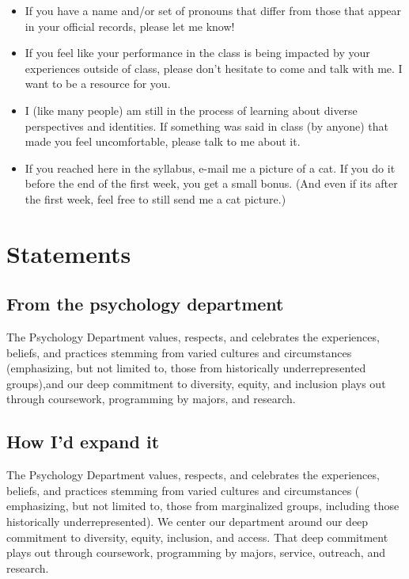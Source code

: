 \begin{itemize}
\item
  If you have a name and/or set of pronouns that differ from those that appear in your official records, please let me know!
\item
  If you feel like your performance in the class is being impacted by your experiences outside of class, please don't hesitate to come and talk with me. I want to be a resource for you.
\item
  I (like many people) am still in the process of learning about diverse perspectives and identities. If something was said in class (by anyone) that made you feel uncomfortable, please talk to me about it.
\item
  If you reached here in the syllabus, e-mail me a picture of a cat. If you do it before the end of the first week, you get a small bonus. (And even if its after the first week, feel free to still send me a cat picture.)
\end{itemize}

\hypertarget{statements}{%
\section{Statements}\label{statements}}

\hypertarget{from-the-psychology-department}{%
\subsection{From the psychology department}\label{from-the-psychology-department}}

The Psychology Department values, respects, and celebrates the experiences, beliefs, and practices stemming from varied cultures and circumstances (emphasizing, but not limited to, those from historically underrepresented groups),and our deep commitment to diversity, equity, and inclusion plays out through coursework, programming by majors, and research.

\hypertarget{how-id-expand-it}{%
\subsection{How I'd expand it}\label{how-id-expand-it}}

The Psychology Department values, respects, and celebrates the experiences, beliefs, and practices stemming from varied cultures and circumstances ( emphasizing, but not limited to, those from marginalized groups, including those historically underrepresented). We center our department around our deep commitment to diversity, equity, inclusion, and access. That deep commitment plays out through coursework, programming by majors, service, outreach, and research.

